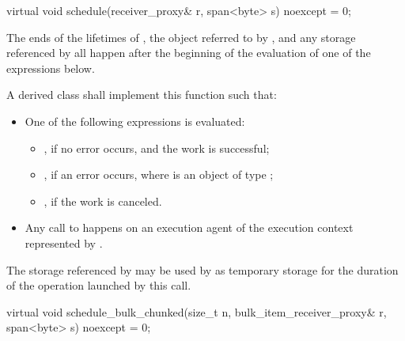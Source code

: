 %
\begin{itemdecl}
virtual void schedule(receiver_proxy& r, span<byte> s) noexcept = 0;
\end{itemdecl}

\begin{itemdescr}
\pnum
\expects
The ends of
the lifetimes of ,
the object referred to by , and
any storage referenced by 
all happen after
the beginning of the evaluation of one of the expressions below.

\pnum
\effects
A derived class shall implement this function such that:
\begin{itemize}
\item
One of the following expressions is evaluated:
\begin{itemize}
\item
{}, if no error occurs, and the work is successful;
\item
{}, if an error occurs,
where  is an object of type ;
\item
{}, if the work is canceled.
\end{itemize}
\item
Any call to  happens on
an execution agent of the execution context represented by .
\end{itemize}

\pnum
\remarks
The storage referenced by 
may be used by  as temporary storage
for the duration of the operation launched by this call.
\end{itemdescr}

%
\begin{itemdecl}
virtual void schedule_bulk_chunked(size_t n, bulk_item_receiver_proxy& r,
                                   span<byte> s) noexcept = 0;
\end{itemdecl}


